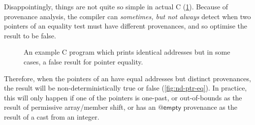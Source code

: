 Disappointingly, things are not quite so simple in actual C
(\cref{fig:nd-ptr-eq-example}). Because of provenance analysis, the compiler can
\emph{sometimes, but not always} detect when two pointers of an
equality test must have different provenances, and so optimise the result to be
false.

\begin{figure}
    \caption{An example C program which prints identical addresses but
        in some cases, a false result for pointer equality.}\label{fig:nd-ptr-eq-example}
\end{figure}

Therefore, when the pointers of an \cinline{==} have equal
addresses but distinct provenances, the result will be
non-deterministically true or false (\cref{fig:nd-ptr-eq}). In practice, this will
only happen if one of the pointers is one-past, or out-of-bounds as
the result of permissive array/member shift, or has an $@\mathsf{empty}$
provenance as the result of a cast from an integer.

